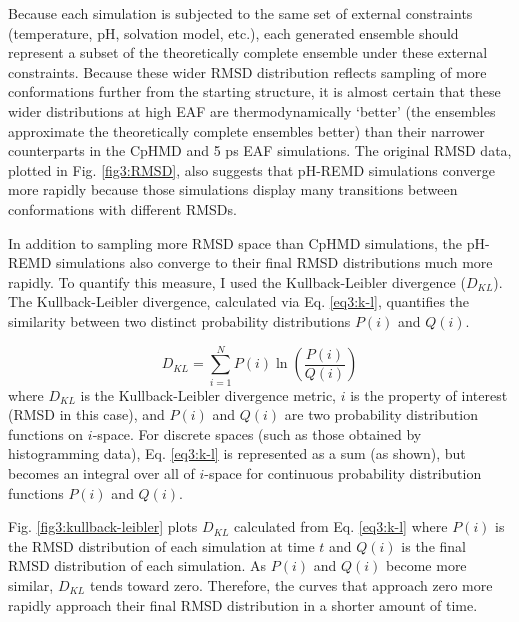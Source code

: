 Because each simulation is subjected to the same set of external constraints
(\eg temperature, pH, solvation model, etc.), each generated ensemble should
represent a subset of the theoretically complete ensemble under these external
constraints.  Because these wider RMSD distribution reflects sampling of more
conformations further from the starting structure, it is almost certain that
these wider distributions at high EAF are thermodynamically `better' (\ie the
ensembles approximate the theoretically complete ensembles better) than their
narrower counterparts in the CpHMD and 5 ps EAF simulations.  The
original RMSD data, plotted in Fig. \ref{fig3:RMSD}, also suggests that pH-REMD
simulations converge more rapidly because those simulations display many
transitions between conformations with different RMSDs.

In addition to sampling more RMSD space than CpHMD simulations, the pH-REMD
simulations also converge to their final RMSD distributions much more rapidly.
To quantify this measure, I used the Kullback-Leibler divergence
\cite{Hamacher2007, McClendon_JChemTheoryComput_2012_v8_p2115} ($D_{KL}$).  The
Kullback-Leibler divergence, calculated via Eq. \ref{eq3:k-l}, quantifies the
similarity between two distinct probability distributions $P(i)$ and $Q(i)$.

\begin{equation}
 D_{KL} = \sum _ {i=1} ^ N P(i) \ln \left( \frac{P(i)} {Q(i)} \right)
 \label{eq3:k-l}
\end{equation}
where $D_{KL}$ is the Kullback-Leibler divergence metric, $i$ is the property of
interest (RMSD in this case), and $P(i)$ and $Q(i)$ are two probability
distribution functions on $i$-space.  For discrete spaces (such as those
obtained by histogramming data), Eq. \ref{eq3:k-l} is represented as a sum (as
shown), but becomes an integral over all of $i$-space for continuous probability
distribution functions $P(i)$ and $Q(i)$.

Fig. \ref{fig3:kullback-leibler} plots $D_{KL}$ calculated from Eq.
\ref{eq3:k-l} where $P(i)$ is the RMSD distribution of each simulation at time
$t$ and $Q(i)$ is the final RMSD distribution of each simulation.  As $P(i)$ and
$Q(i)$ become more similar, $D_{KL}$ tends toward zero.  Therefore, the curves
that approach zero more rapidly approach their final RMSD distribution in a
shorter amount of time.


